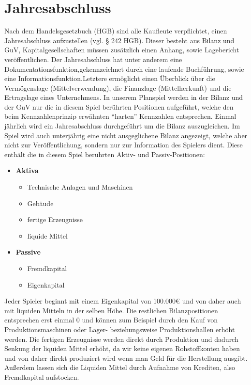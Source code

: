\section{Jahresabschluss} \label{Jahresabschluss}
Nach dem Handelsgesetzbuch (HGB) sind alle Kaufleute verpflichtet, einen Jahresabschluss aufzustellen (vgl. § 242 HGB). Dieser besteht aus Bilanz und GuV, Kapitalgesellschaften müssen zusätzlich einen Anhang, sowie Lagebericht veröffentlichen. Der Jahresabschluss hat unter anderem eine Dokumentationsfunktion,gekennzeichnet durch eine laufende Buchführung, sowie eine Informationsfunktion.Letztere ermöglicht einen Überblick über die Vermögenslage (Mittelverwendung), die Finanzlage (Mittelherkunft) und die Ertragslage eines Unternehmens.
In unserem Planspiel werden in der Bilanz und der GuV nur die in diesem Spiel berührten Positionen aufgeführt, welche den beim Kennzahlenprinzip erwähnten \enquote{harten} Kennzahlen entsprechen. Einmal jährlich wird ein Jahresabschluss durchgeführt um die Bilanz auszugleichen. 
Im Spiel wird auch unterjährig eine nicht ausgeglichene Bilanz angezeigt, welche aber nicht zur Veröffentlichung, sondern nur zur Information des Spielers dient. Diese enthält die in diesem Spiel berührten Aktiv- und Passiv-Positionen: 
\begin{itemize}
\item \textbf{Aktiva}	
	\begin{itemize}
		\item Technische Anlagen und Maschinen
		\item Gebäude
		\item fertige Erzeugnisse
		\item liquide Mittel
	\end{itemize}
\item \textbf{Passive}
	\begin{itemize}
		\item Fremdkapital
		\item Eigenkapital
	\end{itemize}
\end{itemize}

Jeder Spieler beginnt mit einem Eigenkapital von 100.000€ und von daher auch mit liquiden Mitteln in der selben Höhe. Die restlichen Bilanzpositionen entsprechen erst einmal 0 und können zum Beispiel durch den Kauf von Produktionsmaschinen oder Lager- beziehungsweise Produktionshallen erhöht werden. Die fertigen Erzeugnisse werden direkt durch Produktion und dadurch Senkung der liquiden Mittel erhöht, da wir keine eigenen Rohstoffkonten haben und von daher direkt produziert wird wenn man Geld für die Herstellung ausgibt. Außerdem lassen sich die Liquiden Mittel durch Aufnahme von Krediten, also Fremdkapital aufstocken.

